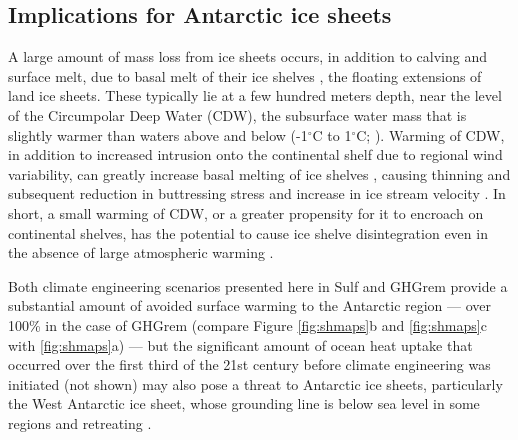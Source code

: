 \documentclass[grl]{AGUTeX}  %
\begin{document}
\begin{article}
\section{Implications for Antarctic ice sheets}
A large amount of mass loss from ice sheets occurs, in addition to calving and surface melt, due to basal melt of their ice shelves \citep{joughin11}, the floating extensions of land ice sheets. These typically lie at a few hundred meters depth, near the level of the Circumpolar Deep Water (CDW), the subsurface water mass that is slightly warmer than waters above and below (-1$^\circ$C to 1$^\circ$C; \cite{yin11}). Warming of CDW, in addition to increased intrusion onto the continental shelf due to regional wind variability, can greatly increase basal melting of ice shelves \citep{joughin11,thoma08}, causing thinning and subsequent reduction in buttressing stress and increase in ice stream velocity \citep{oppenheimer98}. In short, a small warming of CDW, or a greater propensity for it to encroach on continental shelves, has the potential to cause ice shelve disintegration even in the absence of large atmospheric warming \citep{oppenheimer98}. %

Both climate engineering scenarios presented here in Sulf and GHGrem provide a substantial amount of avoided surface warming to the Antarctic region --- over 100\% in the case of GHGrem (compare Figure \ref{fig:shmaps}b and \ref{fig:shmaps}c with \ref{fig:shmaps}a) --- but the significant amount of ocean heat uptake that occurred over the first third of the 21st century before climate engineering was initiated (not shown) may also pose a threat to Antarctic ice sheets, particularly the West Antarctic ice sheet, whose grounding line is below sea level in some regions \citep{joughin11} and retreating \citep{rignot14}. %


\end{article}
\end{document}
